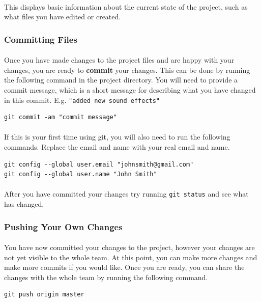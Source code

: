 \documentclass[11pt]{article}
\begin{document}
\paragraph{}
This displays basic information about the current state of the project, such as what files you have edited or created.
\subsubsection{Committing Files}
\paragraph{}
Once you have made changes to the project files and are happy with your changes, you are ready to \textbf{commit} your changes. This can be done by running the following command in the project directory. You will need to provide a commit message, which is a short message for describing what you have changed in this commit. E.g. \lstinline{"added new sound effects"}
\begin{lstlisting}
git commit -am "commit message"
\end{lstlisting}
\paragraph{}
If this is your first time using git, you will also need to run the following commands. Replace the email and name with your real email and name.
\begin{lstlisting}
git config --global user.email "johnsmith@gmail.com"
git config --global user.name "John Smith"
\end{lstlisting}
\paragraph{}
After you have committed your changes try running \lstinline{git status} and see what has changed.
\subsubsection{Pushing Your Own Changes}
\paragraph{}
You have now committed your changes to the project, however your changes are not yet visible to the whole team. At this point, you can make more changes and make more commits if you would like. Once you are ready, you can share the changes with the whole team by running the following command.
\begin{lstlisting}
git push origin master
\end{lstlisting}
\end{document}

